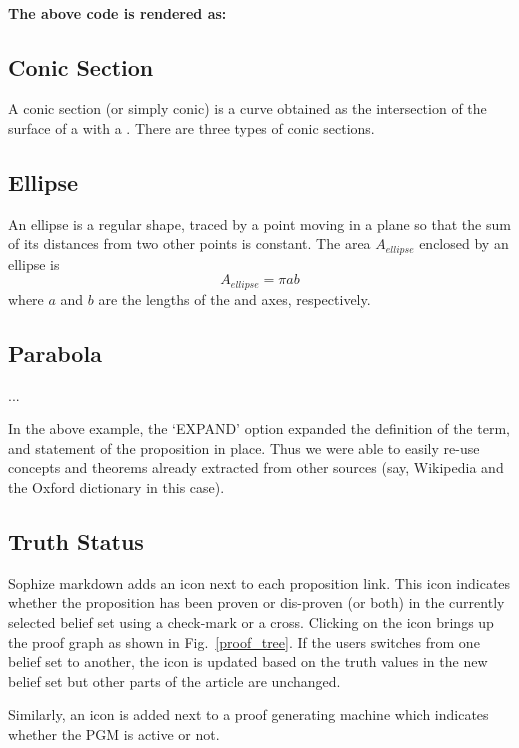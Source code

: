\documentclass[runningheads]{llncs}
\begin{document}
\paragraph{The above code is rendered as:}
\begin{mdframed}
\section*{Conic Section}
A conic section (or simply conic) is a curve obtained as the intersection of the surface of a  with a . There are three types of conic sections.

\subsection*{Ellipse}
An ellipse is a regular  shape, traced by a point moving in a plane so that the sum of its distances from two other points is constant. The area $A_{ellipse}$ enclosed by an ellipse is $$A_{ellipse} = \pi a b$$where $a$ and $b$ are the lengths of the  and  axes, respectively.

\subsection*{Parabola}
...

\end{mdframed}

In the above example, the `EXPAND' option expanded the definition of the term, and statement of the proposition in place. Thus we were able to easily re-use concepts and theorems already extracted from other sources (say, Wikipedia and the Oxford dictionary in this case).

\subsection{Truth Status}

Sophize markdown adds an icon next to each proposition link. This icon indicates whether the proposition has been proven or dis-proven (or both) in the currently selected belief set using a check-mark or a cross. Clicking on the icon brings up the proof graph as shown in Fig.~\ref{proof_tree}. If the users switches from one belief set to another, the icon is updated based on the truth values in the new belief set but other parts of the article are unchanged.

Similarly, an icon is added next to a proof generating machine which indicates whether the PGM is active or not.
\end{document}
